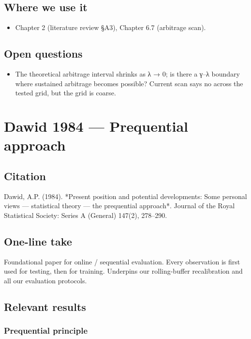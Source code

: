 \documentclass[11pt,a4paper,openany]{report}
\begin{document}
\section{Where we use it}

\begin{itemize}
  \item Chapter 2 (literature review §A3), Chapter 6.7 (arbitrage scan).
\end{itemize}

\section{Open questions}

\begin{itemize}
  \item The theoretical arbitrage interval shrinks as λ → 0; is there a
    γ–λ boundary where sustained arbitrage becomes possible? Current
    scan says no across the tested grid, but the grid is coarse.
\end{itemize}

\chapter{Dawid 1984 — Prequential approach}

\section{Citation}

Dawid, A.P. (1984). *Present position and potential developments: Some
personal views — statistical theory — the prequential approach*.
Journal of the Royal Statistical Society: Series A (General) 147(2),
278–290.

\section{One-line take}

Foundational paper for online / sequential evaluation. Every
observation is first used for testing, then for training. Underpins
our rolling-buffer recalibration and all our evaluation protocols.

\section{Relevant results}

\subsection{Prequential principle}
\end{document}
